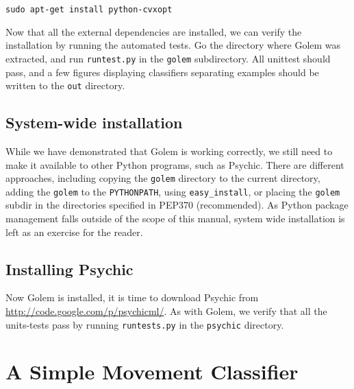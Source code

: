 \documentclass[a4paper]{article}
\begin{document}
\begin{verbatim}
sudo apt-get install python-cvxopt
\end{verbatim}

Now that all the external dependencies are installed, we can verify the
installation by running the automated tests.  Go the
directory where Golem was extracted, and run \texttt{runtest.py} in the
\texttt{golem} subdirectory. All unittest should pass, and a few figures
displaying classifiers separating examples should be written to the
\texttt{out} directory.


\subsection{System-wide installation}
While we have demonstrated that Golem is working correctly, we still need to
make it available to other Python programs, such as Psychic. There are
different approaches, including copying the \texttt{golem} directory to the
current directory, adding the \texttt{golem} to the \texttt{PYTHONPATH}, using
\texttt{easy\_install}, or placing the \texttt{golem} subdir in the directories
specified in PEP370 (recommended). As Python package management falls outside of
the scope of this manual, system wide installation is left as an exercise for
the reader. 

\subsection{Installing Psychic}
Now Golem is installed, it is time to download Psychic from
\url{http://code.google.com/p/psychicml/}. As with Golem, we verify that all
the units-tests pass by running \texttt{runtests.py} in the \texttt{psychic}
directory.

\section{A Simple Movement Classifier}


\end{document}
